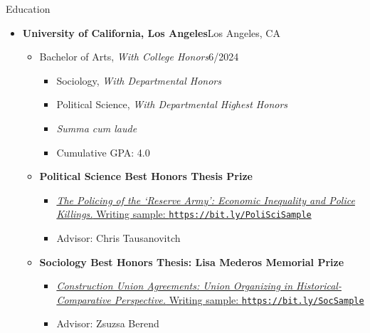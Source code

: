 \documentclass[12pt]{resume} %
\begin{document}
\thispagestyle{firstpagestyle}
\raggedright
\renewcommand{\labelitemi}{\scriptsize$\bullet$}
\begin{rSection}{Education}
\begin{itemize}[leftmargin=0em, itemsep=0pt]
\item[] \textbf{University of California, Los Angeles}\hfill{}Los Angeles, CA
\begin{itemize}[leftmargin=1em, itemsep=0pt]
    \item[] Bachelor of Arts, \textit{With College Honors}\hfill{}6/2024
    \begin{itemize}[leftmargin=1em, itemsep=0pt]
        \item[] Sociology, \textit{With Departmental Honors}
        \item[] Political Science, \textit{With Departmental Highest Honors}
    \item[] \textit{Summa cum laude}
    \item[] Cumulative GPA: 4.0
    \end{itemize}
    \vspace{6pt}
\item[] \textbf{Political Science Best Honors Thesis Prize}
\begin{itemize}[leftmargin=1em, itemsep=0pt, rightmargin=6em]
    \item[] \href{https://bit.ly/PoliSciSample}{\textit{The Policing of the `Reserve Army': Economic Inequality and Police Killings.} Writing sample: \texttt{https://bit.ly/PoliSciSample}}
    \item[] Advisor: Chris Tausanovitch
\end{itemize}
\vspace{6pt}
\item[] \textbf{Sociology Best Honors Thesis: Lisa Mederos Memorial Prize}
\begin{itemize}[leftmargin=1em, itemsep=0pt, rightmargin=5em]
    \item[] \href{https://bit.ly/SocSample}{\textit{Construction Union Agreements: Union Organizing in Historical- Comparative Perspective.} Writing sample: \texttt{https://bit.ly/SocSample}}
    \item[] Advisor: Zsuzsa Berend
    \end{itemize}

\end{itemize}
\end{itemize}
\end{rSection}
\end{document}
